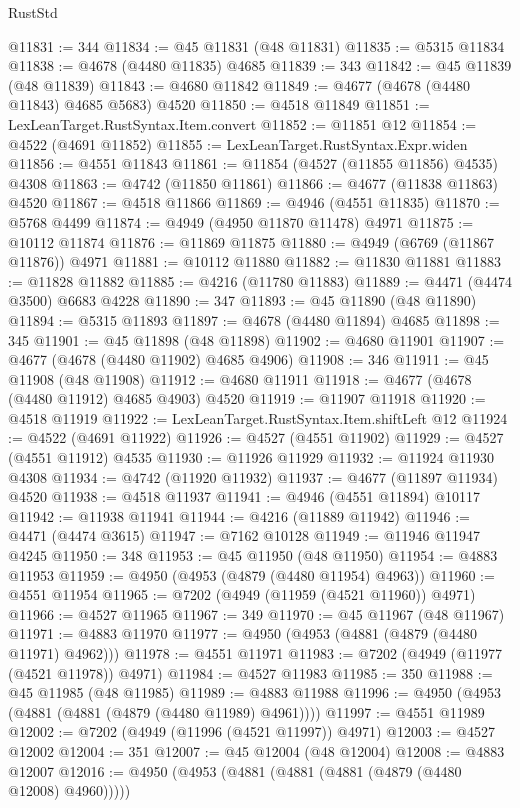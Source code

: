 \begin{lexlean}{RustStd}
\begin{coremodule}
@11831 := 344
@11834 := @45 @11831 (@48 @11831)
@11835 := @5315 @11834
@11838 := @4678 (@4480 @11835) @4685
@11839 := 343
@11842 := @45 @11839 (@48 @11839)
@11843 := @4680 @11842
@11849 := @4677 (@4678 (@4480 @11843) @4685 @5683) @4520
@11850 := @4518 @11849
@11851 := LexLeanTarget.RustSyntax.Item.convert
@11852 := @11851 @12
@11854 := @4522 (@4691 @11852)
@11855 := LexLeanTarget.RustSyntax.Expr.widen
@11856 := @4551 @11843
@11861 := @11854 (@4527 (@11855 @11856) @4535) @4308
@11863 := @4742 (@11850 @11861)
@11866 := @4677 (@11838 @11863) @4520
@11867 := @4518 @11866
@11869 := @4946 (@4551 @11835)
@11870 := @5768 @4499
@11874 := @4949 (@4950 @11870 @11478) @4971
@11875 := @10112 @11874
@11876 := @11869 @11875
@11880 := @4949 (@6769 (@11867 @11876)) @4971
@11881 := @10112 @11880
@11882 := @11830 @11881
@11883 := @11828 @11882
@11885 := @4216 (@11780 @11883)
@11889 := @4471 (@4474 @3500) @6683 @4228
@11890 := 347
@11893 := @45 @11890 (@48 @11890)
@11894 := @5315 @11893
@11897 := @4678 (@4480 @11894) @4685
@11898 := 345
@11901 := @45 @11898 (@48 @11898)
@11902 := @4680 @11901
@11907 := @4677 (@4678 (@4480 @11902) @4685 @4906)
@11908 := 346
@11911 := @45 @11908 (@48 @11908)
@11912 := @4680 @11911
@11918 := @4677 (@4678 (@4480 @11912) @4685 @4903) @4520
@11919 := @11907 @11918
@11920 := @4518 @11919
@11922 := LexLeanTarget.RustSyntax.Item.shiftLeft @12
@11924 := @4522 (@4691 @11922)
@11926 := @4527 (@4551 @11902)
@11929 := @4527 (@4551 @11912) @4535
@11930 := @11926 @11929
@11932 := @11924 @11930 @4308
@11934 := @4742 (@11920 @11932)
@11937 := @4677 (@11897 @11934) @4520
@11938 := @4518 @11937
@11941 := @4946 (@4551 @11894) @10117
@11942 := @11938 @11941
@11944 := @4216 (@11889 @11942)
@11946 := @4471 (@4474 @3615)
@11947 := @7162 @10128
@11949 := @11946 @11947 @4245
@11950 := 348
@11953 := @45 @11950 (@48 @11950)
@11954 := @4883 @11953
@11959 := @4950 (@4953 (@4879 (@4480 @11954) @4963))
@11960 := @4551 @11954
@11965 := @7202 (@4949 (@11959 (@4521 @11960)) @4971)
@11966 := @4527 @11965
@11967 := 349
@11970 := @45 @11967 (@48 @11967)
@11971 := @4883 @11970
@11977 := @4950 (@4953 (@4881 (@4879 (@4480 @11971) @4962)))
@11978 := @4551 @11971
@11983 := @7202 (@4949 (@11977 (@4521 @11978)) @4971)
@11984 := @4527 @11983
@11985 := 350
@11988 := @45 @11985 (@48 @11985)
@11989 := @4883 @11988
@11996 := @4950 (@4953 (@4881 (@4881 (@4879 (@4480 @11989) @4961))))
@11997 := @4551 @11989
@12002 := @7202 (@4949 (@11996 (@4521 @11997)) @4971)
@12003 := @4527 @12002
@12004 := 351
@12007 := @45 @12004 (@48 @12004)
@12008 := @4883 @12007
@12016 := @4950 (@4953 (@4881 (@4881 (@4881 (@4879 (@4480 @12008) @4960)))))

\end{coremodule}
\end{lexlean}
